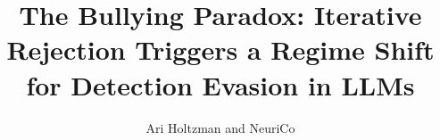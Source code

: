 \documentclass{article}
\title{The Bullying Paradox: Iterative Rejection Triggers a Regime Shift for Detection Evasion in LLMs}
\author{Ari Holtzman and NeuriCo}
\begin{document}
\maketitle

\begin{abstract}

\end{abstract}








\newpage


\end{document}
